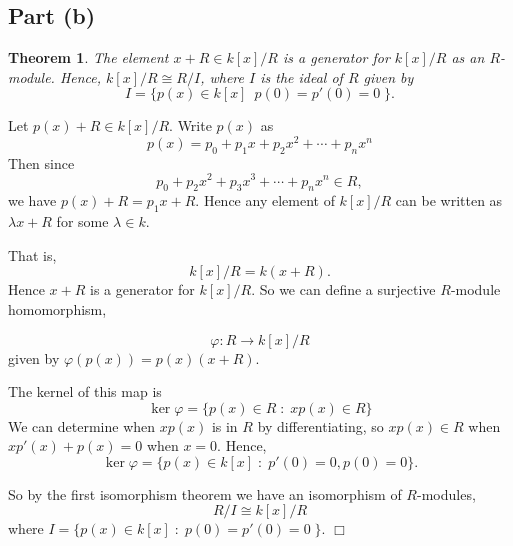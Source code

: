 \documentclass[10pt]{article}
\newtheorem{theorem}{Theorem}
\newenvironment{proof}[1][Proof]{\begin{trivlist}
\item[\hskip \labelsep {\bfseries #1}]}{\end{trivlist}}
\newcommand{\isom}{\cong}
\begin{document}
\subsection*{Part (b)}
    \begin{theorem}
        The element $x+R \in k[x]/R$ is a generator
        for $k[x]/R$ as an $R$-module. Hence, 
        $k[x]/R \isom R/I$, where $I$
        is the ideal of $R$ given by
        \begin{equation*}
            I = \{p(x)\in k[x]\;\:p(0) = p'(0) = 0\;\}.
        \end{equation*}        
    \end{theorem}
    \begin{proof}
        Let $p(x)+R \in k[x]/R$. Write $p(x)$ as 
        \begin{equation*}
            p(x) = p_0+p_1 x+p_2 x^2+\cdots+p_n x^n
        \end{equation*}
        Then since
        \begin{equation*}
            p_0+p_2 x^2+p_3 x^3+\cdots+p_n x^n \in R,
        \end{equation*}
        we have $p(x)+R = p_1 x+R$. Hence any element 
        of $k[x]/R$ can be written as $\lambda x+R$ for some $\lambda \in k$.
        
        That is,
        \begin{equation*}
            k[x]/R = k(x+R).
        \end{equation*}
        Hence $x+R$ is a generator for $k[x]/R$. So we can define
        a surjective $R$-module homomorphism,
        
        \begin{equation*}
            \varphi:R\rightarrow k[x]/R
        \end{equation*}
        given by $\varphi(p(x)) = p(x)(x+R)$.
        
        The kernel of this map is
        \begin{equation*}
            \ker\varphi = \{p(x) \in R\;:\;xp(x)\in R\}
        \end{equation*}
        We can determine when $xp(x)$ is in $R$ by differentiating,
        so $xp(x) \in R$ when $xp'(x) + p(x) = 0$ when $x = 0$.
        Hence,
        \begin{equation*}
            \ker\varphi = \{p(x) \in k[x]\;:\;p'(0) = 0, p(0) = 0\}.
        \end{equation*}
        
        So by the first isomorphism theorem we have an isomorphism of $R$-modules,
        \begin{equation*}
            R/I \isom k[x]/R
        \end{equation*}
        where $I = \{p(x) \in k[x]\;:\;p(0) = p'(0) = 0\;\}$. $\Box$    
    \end{proof}
\end{document}
